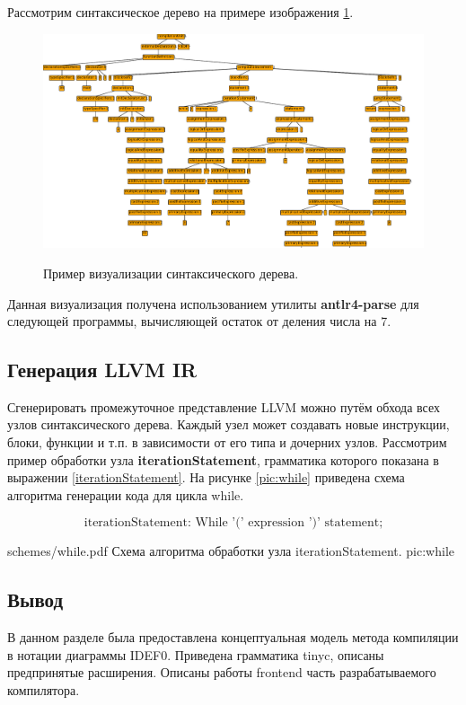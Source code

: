 Рассмотрим синтаксическое дерево на примере изображения \ref{div7:tree}.
\begin{figure}[h!]
	\begin{center}
		{\includegraphics[width=0.85\textheight, angle = 90]{img/div7.pdf}}
		\caption{Пример визуализации синтаксического дерева.}
		\label{div7:tree}
	\end{center}
\end{figure}
\pagebreak

Данная визуализация получена использованием утилиты \textbf{antlr4-parse} для следующей программы, вычисляющей остаток от деления числа на 7.

\label{lst:fib}

\subsection{Генерация LLVM IR}
Сгенерировать промежуточное представление LLVM можно путём обхода всех узлов синтаксического дерева. Каждый узел может создавать новые инструкции, блоки, функции и т.п. в зависимости от его типа и дочерних узлов. Рассмотрим пример обработки узла \textbf{iterationStatement}, грамматика которого показана в выражении \ref{iterationStatement}. На рисунке \ref{pic:while} приведена схема алгоритма генерации кода для цикла while.

\begin{equation}
    \label{iterationStatement}
    \text{iterationStatement: While '(' expression ')' statement;}
\end{equation}

\myImage
{schemes/while.pdf}
{Схема алгоритма обработки узла iterationStatement.}
{pic:while}

\subsection*{Вывод}
В данном разделе была предоставлена концептуальная модель метода компиляции в нотации диаграммы IDEF0. Приведена грамматика tinyc, описаны предпринятые расширения. Описаны работы frontend часть разрабатываемого компилятора.

\pagebreak
